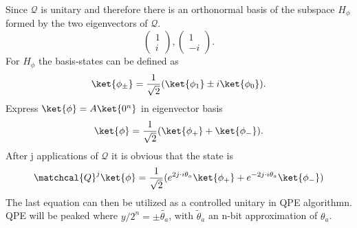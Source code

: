\documentclass[../../main.tex]{subfiles}
\begin{document}
Since $\mathcal{Q}$ is unitary and therefore there is an orthonormal basis of the subspace $H_{\phi}$ formed
by the two eigenvectors of $\mathcal{Q}$.
\begin{equation}\label{eq:eigenvectors}
  \begin{pmatrix}
    1\\
    i
  \end{pmatrix}
  ,
  \begin{pmatrix}
    1\\
    -i
  \end{pmatrix}.
\end{equation}
For $H_{\phi}$ the basis-states can be defined as
\begin{equation}\label{eq:HBasisStates}
  \ket{\phi_{\pm}} = \frac{1}{\sqrt{2}} (\ket{\phi_1} \pm i \ket{\phi_0}).
\end{equation} 
Express $\ket{\phi} = A \ket{0^n}$ in eigenvector basis 
\begin{equation}
  \ket{\phi} = \frac{1}{\sqrt{2}} ( \ket{\phi_+} + \ket{\phi_-}).
\end{equation}
After j applications of $\mathcal{Q}$ it is obvious that the state is
\begin{equation}\label{eq:PhiAfterJQ}
   \matchcal{Q}^j \ket{\phi} = \frac{1}{\sqrt{2}} ( e^{2j \cdot i \theta_a}\ket{\phi_+} + e^{-2j \cdot i \theta_a}\ket{\phi_-})
\end{equation}
The last equation can then be utilized as a controlled unitary in QPE algorithmn. QPE will be peaked where $y/2^n = \pm \tilde{\theta_a}$,
with $\tilde{\theta}_a$ an n-bit approximation of $\theta_a$.
\end{document}
